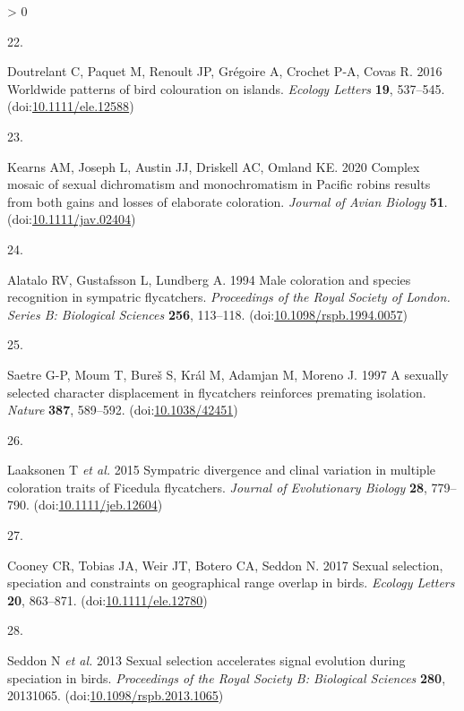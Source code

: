 \documentclass[
  a4paper,
]{article}
\newlength{\cslhangindent}
\newlength{\csllabelwidth}
\newenvironment{CSLReferences}[2] %
 {%
  \setlength{\parindent}{0pt}
  \ifodd #1 \everypar{\setlength{\hangindent}{\cslhangindent}}\ignorespaces\fi
  \ifnum #2 > 0
  \setlength{\parskip}{#2\baselineskip}
  \fi
 }%
 {}
\newcommand{\CSLLeftMargin}[1]{\parbox[t]{\csllabelwidth}{#1}}
\newcommand{\CSLRightInline}[1]{\parbox[t]{\linewidth - \csllabelwidth}{#1}\break}
\begin{document}
\begin{CSLReferences}{0}{0}
\leavevmode\hypertarget{ref-doutrelant2016}{}%
\CSLLeftMargin{22. }
\CSLRightInline{Doutrelant C, Paquet M, Renoult JP, Grégoire A, Crochet
P-A, Covas R. 2016 Worldwide patterns of bird colouration on islands.
\emph{Ecology Letters} \textbf{19}, 537--545.
(doi:\href{https://doi.org/10.1111/ele.12588}{10.1111/ele.12588})}

\leavevmode\hypertarget{ref-kearns2020}{}%
\CSLLeftMargin{23. }
\CSLRightInline{Kearns AM, Joseph L, Austin JJ, Driskell AC, Omland KE.
2020 Complex mosaic of sexual dichromatism and monochromatism in
{Pacific} robins results from both gains and losses of elaborate
coloration. \emph{Journal of Avian Biology} \textbf{51}.
(doi:\href{https://doi.org/10.1111/jav.02404}{10.1111/jav.02404})}

\leavevmode\hypertarget{ref-alatalo1994}{}%
\CSLLeftMargin{24. }
\CSLRightInline{Alatalo RV, Gustafsson L, Lundberg A. 1994 Male
coloration and species recognition in sympatric flycatchers.
\emph{Proceedings of the Royal Society of London. Series B: Biological
Sciences} \textbf{256}, 113--118.
(doi:\href{https://doi.org/10.1098/rspb.1994.0057}{10.1098/rspb.1994.0057})}

\leavevmode\hypertarget{ref-saetre1997}{}%
\CSLLeftMargin{25. }
\CSLRightInline{Saetre G-P, Moum T, Bureš S, Král M, Adamjan M, Moreno
J. 1997 A sexually selected character displacement in flycatchers
reinforces premating isolation. \emph{Nature} \textbf{387}, 589--592.
(doi:\href{https://doi.org/10.1038/42451}{10.1038/42451})}

\leavevmode\hypertarget{ref-laaksonen2015}{}%
\CSLLeftMargin{26. }
\CSLRightInline{Laaksonen T \emph{et al.} 2015 Sympatric divergence and
clinal variation in multiple coloration traits of {Ficedula}
flycatchers. \emph{Journal of Evolutionary Biology} \textbf{28},
779--790.
(doi:\href{https://doi.org/10.1111/jeb.12604}{10.1111/jeb.12604})}

\leavevmode\hypertarget{ref-cooney2017}{}%
\CSLLeftMargin{27. }
\CSLRightInline{Cooney CR, Tobias JA, Weir JT, Botero CA, Seddon N. 2017
Sexual selection, speciation and constraints on geographical range
overlap in birds. \emph{Ecology Letters} \textbf{20}, 863--871.
(doi:\href{https://doi.org/10.1111/ele.12780}{10.1111/ele.12780})}

\leavevmode\hypertarget{ref-seddon2013}{}%
\CSLLeftMargin{28. }
\CSLRightInline{Seddon N \emph{et al.} 2013 Sexual selection accelerates
signal evolution during speciation in birds. \emph{Proceedings of the
Royal Society B: Biological Sciences} \textbf{280}, 20131065.
(doi:\href{https://doi.org/10.1098/rspb.2013.1065}{10.1098/rspb.2013.1065})}


\end{CSLReferences}
\end{document}
